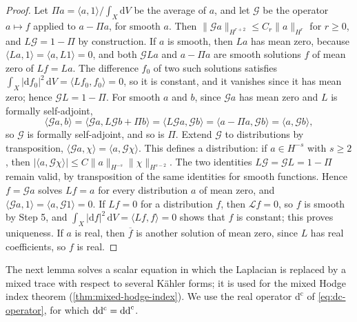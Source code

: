 \begin{proof}
Let $\Pi a=\langle a,1\rangle/\int_X\mathrm dV$ be the average of $a$, and let $\mathcal G$ be the operator $a\mapsto f$ applied to $a-\Pi a$, for smooth $a$. Then $\|\mathcal Ga\|_{H^{r+2}}\leq C_r\|a\|_{H^r}$ for $r\geq0$, and $L\mathcal G=1-\Pi$ by construction. If $a$ is smooth, then $La$ has mean zero, because $\langle La,1\rangle=\langle a,L1\rangle=0$, and both $\mathcal GLa$ and $a-\Pi a$ are smooth solutions $f$ of mean zero of $Lf=La$. The difference $f_0$ of two such solutions satisfies $\int_X|\mathrm df_0|^2\,\mathrm dV=\langle Lf_0,f_0\rangle=0$, so it is constant, and it vanishes since it has mean zero; hence $\mathcal GL=1-\Pi$. For smooth $a$ and $b$, since $\mathcal Ga$ has mean zero and $L$ is formally self-adjoint,
\[
 \langle\mathcal Ga,b\rangle=\langle\mathcal Ga,L\mathcal Gb+\Pi b\rangle=\langle L\mathcal Ga,\mathcal Gb\rangle=\langle a-\Pi a,\mathcal Gb\rangle=\langle a,\mathcal Gb\rangle,
\]
so $\mathcal G$ is formally self-adjoint, and so is $\Pi$. Extend $\mathcal G$ to distributions by transposition, $\langle\mathcal Ga,\chi\rangle=\langle a,\mathcal G\chi\rangle$. This defines a distribution: if $a\in H^{-s}$ with $s\geq2$, then $|\langle a,\mathcal G\chi\rangle|\leq C\|a\|_{H^{-s}}\|\chi\|_{H^{s-2}}$. The two identities $L\mathcal G=\mathcal GL=1-\Pi$ remain valid, by transposition of the same identities for smooth functions. Hence $f=\mathcal Ga$ solves $Lf=a$ for every distribution $a$ of mean zero, and $\langle\mathcal Ga,1\rangle=\langle a,\mathcal G1\rangle=0$. If $Lf=0$ for a distribution $f$, then $\mathcal Lf=0$, so $f$ is smooth by Step 5, and $\int_X|\mathrm df|^2\,\mathrm dV=\langle Lf,f\rangle=0$ shows that $f$ is constant; this proves uniqueness. If $a$ is real, then $\overline f$ is another solution of mean zero, since $L$ has real coefficients, so $f$ is real.
\end{proof}

The next lemma solves a scalar equation in which the Laplacian is replaced by a mixed trace with respect to several K\"ahler forms; it is used for the mixed Hodge index theorem (\cref{thm:mixed-hodge-index}). We use the real operator $\mathrm d^{\mathrm c}$ of \eqref{eq:dc-operator}, for which $\mathrm d\mathrm d^{\mathrm c}=\mathrm{dd}^{\mathrm{c}}$.

